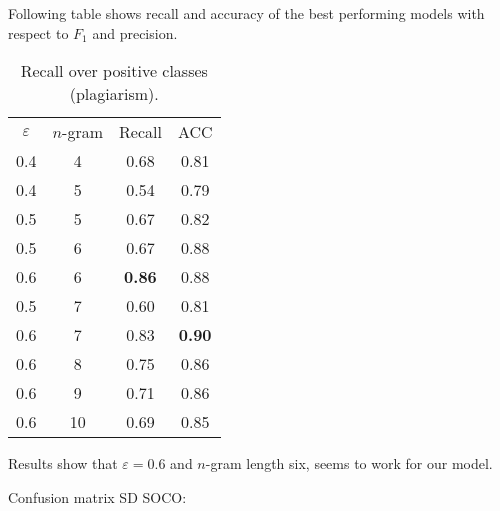 %    

\newpage
























\newpage

Following table shows recall and accuracy of the best performing models with respect to $F_1$ and precision.

\begin{table}[ht]
\centering
\caption{Recall over positive classes (plagiarism).}
\label{lbl-sd-best-perf}
\begin{tabular}{|c|c|c|c|} \hline
$\varepsilon$  & $n$-gram & Recall & ACC  \\ \hhline{|=|=|=|=|}
0.4 & 4  & 0.68   & 0.81 \\ \hline
0.4 & 5  & 0.54   & 0.79 \\ 
0.5 & 5  & 0.67   & 0.82 \\ \hline
0.5 & 6  & 0.67   & 0.88 \\
0.6 & 6  & \bf 0.86   & 0.88 \\ \hline
0.5 & 7  & 0.60    & 0.81 \\
0.6 & 7  & 0.83   & \bf 0.90  \\ \hline
0.6 & 8  & 0.75   & 0.86 \\ \hline
0.6 & 9  & 0.71   & 0.86 \\ \hline
0.6 & 10 & 0.69   & 0.85 \\ \hline
\end{tabular}
\end{table}

\newpage

Results show that $\varepsilon = 0.6$ and $n$-gram length six, seems to work for our model. 

Confusion matrix SD SOCO:

